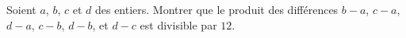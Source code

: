 Soient $a$, $b$, $c$ et $d$ des entiers. Montrer que le produit des
différences $b - a$, $c - a$, $d - a$, $c - b$, $d - b$, et $d - c$ est
divisible par $12$.
